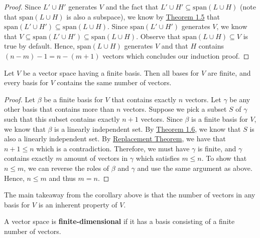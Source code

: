\begin{proof}
Since \( L' \cup H' \) generates \( V  \) and the fact that \( L' \cup H' \subseteq \text{span}(L \cup H ) \) (note that \( \text{span}(L \cup H)   \) is also a subspace), we know by {\hyperref[Theorem 1.5]{Theorem 1.5}} that \( \text{span}(L' \cup H') \subseteq \text{span}(L \cup H) \). Since \( \text{span}(L' \cup H')  \) generates \( V  \), we know that \( V \subseteq \text{span}(L' \cup H') \subseteq \text{span}(L \cup H ) \). Observe that \( \text{span}(L \cup H ) \subseteq V  \) is true by default. Hence, \( \text{span}(L \cup H ) \) generates \( V  \) and that \( H  \) contains \( (n-m) - 1 = n - (m+1)  \) vectors which concludes our induction proof.
\end{proof}


\begin{corollary}[ ]
   Let \( V  \) be a vector space having a finite basis. Then all bases for \( V  \) are finite, and every basis for \( V  \) contains the same number of vectors. 
\end{corollary}
\begin{proof}
    Let \( \beta \) be a finite basis for \( V  \) that contains exactly \( n  \) vectors. Let \( \gamma \) be any other basis that contains more than \( n  \) vectors. Suppose we pick a subset \( S  \) of \( \gamma  \) such that this subset contains exactly \( n + 1  \) vectors. Since \( \beta \) is a finite basis for \( V  \), we know that \( \beta \) is a linearly independent set. By {\hyperref[Theorem 1.6]{Theorem 1.6}}, we know that \( S  \) is also a linearly independent set. By {\hyperref[Replacement Theorem]{Replacement Theorem}}, we have that \( n + 1 \leq n  \) which is a contradiction. Therefore, we must have \( \gamma  \) is finite, and \( \gamma \) contains exactly \( m  \) amount of vectors in \( \gamma \) which satisfies \( m \leq n \). To show that \( n \leq m  \), we can reverse the roles of \( \beta \) and \( \gamma \) and use the same argument as above. Hence, \( n \leq m \) and thus \( m = n  \). 
\end{proof}

The main takeaway from the corollary above is that the number of vectors in any basis for \( V  \) is an inherent property of \( V  \).  

\begin{definition}\label{Finite-dimensional}
   A vector space is \textbf{finite-dimensional} if it has a basis consisting of a finite number of vectors.  
\end{definition}

